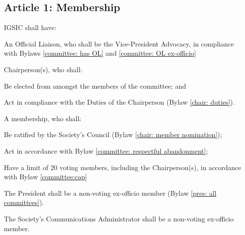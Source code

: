 \subsection{Article 1: Membership}
\begin{longenum}[ label*=\thesubsection.\arabic*., align=left] 
\item IGSIC shall have:
	\begin{longenum}[ label*=\arabic*., align=left]
	\item An Official Liaison, who shall be the Vice-President Advocacy, in compliance with Bylaws \ref{committee: has OL} and \ref{committee: OL ex-officio}
	\item Chairperson(s), who shall:
	\begin{longenum}[ label*=\arabic*., align=left]
		\item Be elected from amongst the members of the committee; and
		\item Act in compliance with the Duties of the Chairperson (Bylaw \ref{chair: duties}).
	\end{longenum}
	\item A membership, who shall:
	\begin{longenum}[ label*=\arabic*., align=left]
		\item Be ratified by the Society’s Council (Bylaw \ref{chair: member nomination});
		\item Act in accordance with Bylaw \ref{committee: respectful abandonment};
		\item Have a limit of 20 voting members, including the Chairperson(s), in accordance with Bylaw \ref{committee:cap}
	\end{longenum}
	\end{longenum}
\item The President shall be a non-voting ex-officio member (Bylaw \ref{pres: all committees}).
\item The Society's Communications Administrator shall be a non-voting ex-officio member.
\end{longenum}


